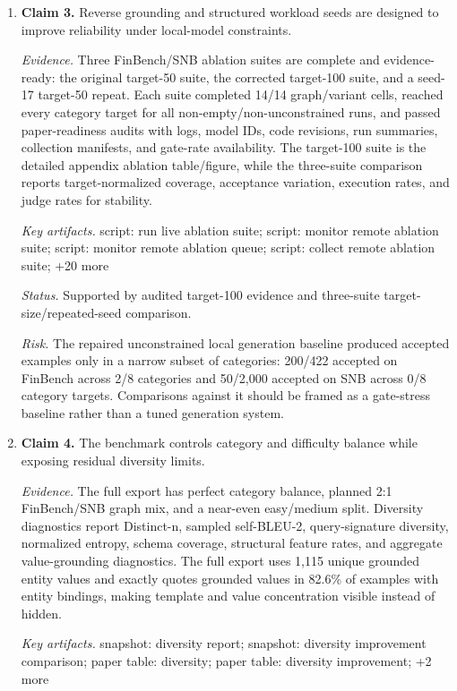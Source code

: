 \begin{enumerate}
\item \textbf{Claim 3.} Reverse grounding and structured workload seeds are designed to improve reliability under local-model constraints.\par
\textit{Evidence.} Three FinBench/SNB ablation suites are complete and evidence-ready: the original target-50 suite, the corrected target-100 suite, and a seed-17 target-50 repeat. Each suite completed 14/14 graph/variant cells, reached every category target for all non-empty/non-unconstrained runs, and passed paper-readiness audits with logs, model IDs, code revisions, run summaries, collection manifests, and gate-rate availability. The target-100 suite is the detailed appendix ablation table/figure, while the three-suite comparison reports target-normalized coverage, acceptance variation, execution rates, and judge rates for stability.\par
\textit{Key artifacts.} script: run live ablation suite; script: monitor remote ablation suite; script: monitor remote ablation queue; script: collect remote ablation suite; +20 more\par
\textit{Status.} Supported by audited target-100 evidence and three-suite target-size/repeated-seed comparison.\par
\textit{Risk.} The repaired unconstrained local generation baseline produced accepted examples only in a narrow subset of categories: 200/422 accepted on FinBench across 2/8 categories and 50/2,000 accepted on SNB across 0/8 category targets. Comparisons against it should be framed as a gate-stress baseline rather than a tuned generation system.
\item \textbf{Claim 4.} The benchmark controls category and difficulty balance while exposing residual diversity limits.\par
\textit{Evidence.} The full export has perfect category balance, planned 2:1 FinBench/SNB graph mix, and a near-even easy/medium split. Diversity diagnostics report Distinct-n, sampled self-BLEU-2, query-signature diversity, normalized entropy, schema coverage, structural feature rates, and aggregate value-grounding diagnostics. The full export uses 1,115 unique grounded entity values and exactly quotes grounded values in 82.6\% of examples with entity bindings, making template and value concentration visible instead of hidden.\par
\textit{Key artifacts.} snapshot: diversity report; snapshot: diversity improvement comparison; paper table: diversity; paper table: diversity improvement; +2 more\par

\end{enumerate}
